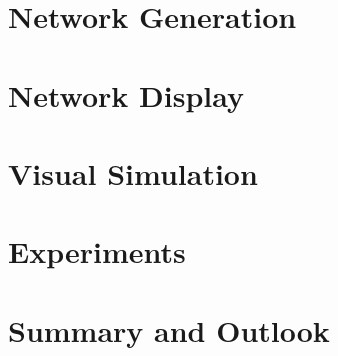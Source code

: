\documentclass[oneside]{ausarbeitung}
\begin{document}
\chapter{Network Generation}
\label{cha:network_generation}


\chapter{Network Display}
\label{cha:network_display}


\chapter{Visual Simulation}
\label{cha:visual_simulation}


\chapter{Experiments}
\label{cha:experiments}


\chapter{Summary and Outlook}
\label{cha:summary}


% 

% 

% 

% 

% 

% 

\appendix

\printbibliography[heading=bibintoc]
\end{document}
